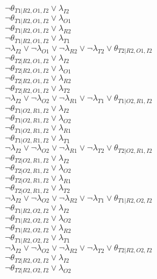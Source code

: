 $\neg\theta_{T1|R2,O1,I2} \vee \lambda_{I2}$\\
$\neg\theta_{T1|R2,O1,I2} \vee \lambda_{O1}$\\
$\neg\theta_{T1|R2,O1,I2} \vee \lambda_{R2}$\\
$\neg\theta_{T1|R2,O1,I2} \vee \lambda_{T1}$\\
$\neg\lambda_{I2} \vee \neg\lambda_{O1} \vee \neg\lambda_{R2} \vee \neg\lambda_{T2} \vee \theta_{T2|R2,O1,I2}$\\
$\neg\theta_{T2|R2,O1,I2} \vee \lambda_{I2}$\\
$\neg\theta_{T2|R2,O1,I2} \vee \lambda_{O1}$\\
$\neg\theta_{T2|R2,O1,I2} \vee \lambda_{R2}$\\
$\neg\theta_{T2|R2,O1,I2} \vee \lambda_{T2}$\\
$\neg\lambda_{I2} \vee \neg\lambda_{O2} \vee \neg\lambda_{R1} \vee \neg\lambda_{T1} \vee \theta_{T1|O2,R1,I2}$\\
$\neg\theta_{T1|O2,R1,I2} \vee \lambda_{I2}$\\
$\neg\theta_{T1|O2,R1,I2} \vee \lambda_{O2}$\\
$\neg\theta_{T1|O2,R1,I2} \vee \lambda_{R1}$\\
$\neg\theta_{T1|O2,R1,I2} \vee \lambda_{T1}$\\
$\neg\lambda_{I2} \vee \neg\lambda_{O2} \vee \neg\lambda_{R1} \vee \neg\lambda_{T2} \vee \theta_{T2|O2,R1,I2}$\\
$\neg\theta_{T2|O2,R1,I2} \vee \lambda_{I2}$\\
$\neg\theta_{T2|O2,R1,I2} \vee \lambda_{O2}$\\
$\neg\theta_{T2|O2,R1,I2} \vee \lambda_{R1}$\\
$\neg\theta_{T2|O2,R1,I2} \vee \lambda_{T2}$\\
$\neg\lambda_{I2} \vee \neg\lambda_{O2} \vee \neg\lambda_{R2} \vee \neg\lambda_{T1} \vee \theta_{T1|R2,O2,I2}$\\
$\neg\theta_{T1|R2,O2,I2} \vee \lambda_{I2}$\\
$\neg\theta_{T1|R2,O2,I2} \vee \lambda_{O2}$\\
$\neg\theta_{T1|R2,O2,I2} \vee \lambda_{R2}$\\
$\neg\theta_{T1|R2,O2,I2} \vee \lambda_{T1}$\\
$\neg\lambda_{I2} \vee \neg\lambda_{O2} \vee \neg\lambda_{R2} \vee \neg\lambda_{T2} \vee \theta_{T2|R2,O2,I2}$\\
$\neg\theta_{T2|R2,O2,I2} \vee \lambda_{I2}$\\
$\neg\theta_{T2|R2,O2,I2} \vee \lambda_{O2}$\\
